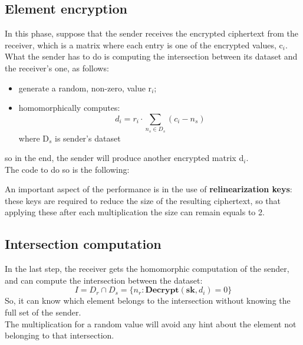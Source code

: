 \documentclass[10pt]{extarticle}
\begin{document}
\subsection{Element encryption}
In this phase, suppose that the sender receives the encrypted ciphertext from the receiver, which is a matrix where each entry is one of the encrypted values, c$_i$.\\What the sender has to do is computing the intersection between its dataset and the receiver's one, as follows:
\begin{itemize}
    \item generate a random, non-zero, value r$_i$;
    \item homomorphically computes:
        \begin{equation}
            d_i = r_i \cdot \sum\limits_{n_s \in D_s} (c_i - n_s)
        \end{equation}
    where D$_s$ is sender's dataset
\end{itemize}
so in the end, the sender will produce another encrypted matrix d$_i$.\\The code to do so is the following:
\newpage



An important aspect of the performance is in the use of \textbf{relinearization keys}: these keys are required to reduce the size of the resulting ciphertext, so that applying these after each multiplication the size can remain equals to 2.

\subsection{Intersection computation}
In the last step, the receiver gets the homomorphic computation of the sender, and can compute the intersection between the dataset:
\begin{equation}
    I = D_r \cap D_s = \{n_r: \textbf{Decrypt}(\textbf{sk}, d_i) = 0\}
\end{equation}
So, it can know which element belongs to the intersection without knowing the full set of the sender.\\
The multiplication for a random value will avoid any hint about the element not belonging to that intersection.
\end{document}
